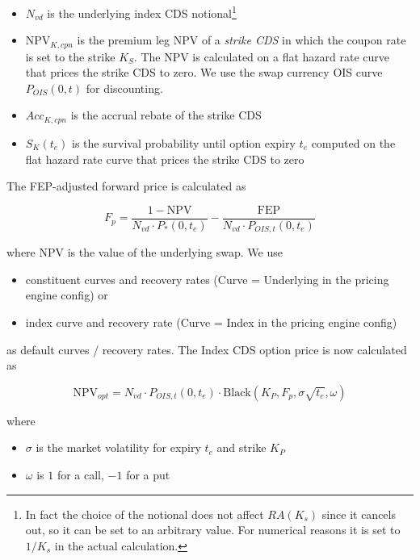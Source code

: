 \begin{itemize}
\item $N_{vd}$ is the underlying index CDS notional\footnote{In fact the choice of the notional does not affect
$RA(K_s)$ since it cancels out, so it can be set to an arbitrary value. For numerical reasons it is set to $1/K_s$ in
the actual calculation.}
\item $\text{NPV}_{K,cpn}$ is the premium leg NPV of a {\em strike CDS} in which the coupon rate is set to the strike
  $K_S$. The NPV is calculated on a flat hazard rate curve that prices the strike CDS to zero. We use the swap currency
  OIS curve $P_{OIS}(0,t)$ for discounting.
\item $Acc_{K,cpn}$ is the accrual rebate of the strike CDS
\item $S_K(t_e)$ is the survival probability until option expiry $t_e$ computed on the flat hazard rate curve that prices
  the strike CDS to zero
\end{itemize}

The FEP-adjusted forward price is calculated as

\begin{equation}\label{pricing:cr_indexcdsoption_fep_adjusted_forward}
F_p = \frac{1 - \text{NPV}}{N_{vd} \cdot P_{*}(0,t_e)} - \frac{\text{FEP}}{N_{vd} \cdot P_{OIS,t}(0,t_e)}
\end{equation}

where NPV is the value of the underlying swap. We use

\begin{itemize}
\item constituent curves and recovery rates (Curve = Underlying in the pricing engine config) or
\item index curve and recovery rate (Curve = Index in the pricing engine config)
\end{itemize}

as default curves / recovery rates. The Index CDS option price is now calculated as

\begin{equation}
\text{NPV}_{opt} = N_{vd} \cdot P_{OIS,t}(0, t_e) \cdot \text{Black} \left( K_P, F_p, \sigma\sqrt{t_e}, \omega \right)
\end{equation}

where

\begin{itemize}
\item $\sigma$ is the market volatility for expiry $t_e$ and strike $K_P$
\item $\omega$ is $1$ for a call, $-1$ for a put
\end{itemize}

